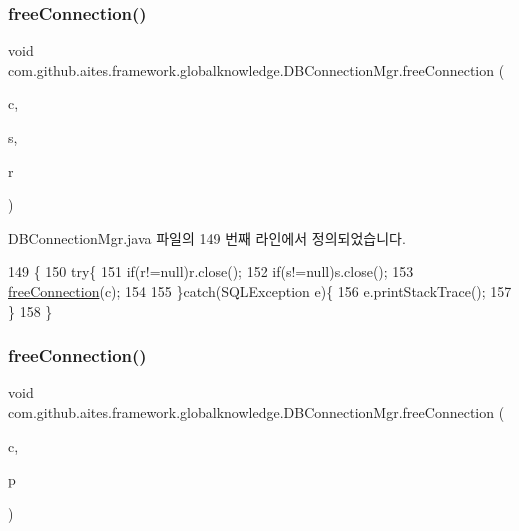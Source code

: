 \subsubsection{\texorpdfstring{free\+Connection()}{freeConnection()}\hspace{0.1cm}{\footnotesize\ttfamily [3/5]}}
{\footnotesize\ttfamily void com.\+github.\+aites.\+framework.\+globalknowledge.\+D\+B\+Connection\+Mgr.\+free\+Connection (\begin{DoxyParamCaption}\item[{Connection}]{c,  }\item[{Statement}]{s,  }\item[{Result\+Set}]{r }\end{DoxyParamCaption})}



D\+B\+Connection\+Mgr.\+java 파일의 149 번째 라인에서 정의되었습니다.


\begin{DoxyCode}
149                                                                       \{
150         \textcolor{keywordflow}{try}\{
151             \textcolor{keywordflow}{if}(r!=null)r.close();
152             \textcolor{keywordflow}{if}(s!=null)s.close();
153             \mbox{\hyperlink{classcom_1_1github_1_1aites_1_1framework_1_1globalknowledge_1_1_d_b_connection_mgr_a4c1302a674f9c74b55f6fae96bf79b64}{freeConnection}}(c);
154             
155         \}\textcolor{keywordflow}{catch}(SQLException e)\{
156             e.printStackTrace();
157         \}
158     \}
\end{DoxyCode}
\mbox{\label{classcom_1_1github_1_1aites_1_1framework_1_1globalknowledge_1_1_d_b_connection_mgr_a7f42210ce41c75a91b96b8bebb276f6f}} 
\subsubsection{\texorpdfstring{free\+Connection()}{freeConnection()}\hspace{0.1cm}{\footnotesize\ttfamily [4/5]}}
{\footnotesize\ttfamily void com.\+github.\+aites.\+framework.\+globalknowledge.\+D\+B\+Connection\+Mgr.\+free\+Connection (\begin{DoxyParamCaption}\item[{Connection}]{c,  }\item[{Prepared\+Statement}]{p }\end{DoxyParamCaption})}



